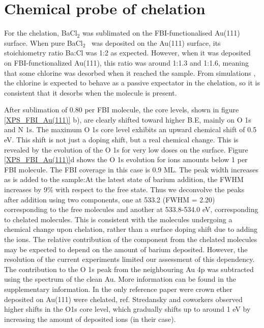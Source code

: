 \documentclass[aps,prl,reprint,longbibliography,superscriptaddress, english]{revtex4-1}
\def\BappCl{BaCl$_2$ }
\begin{document}
\section{Chemical probe of chelation}
For the chelation, \BappCl was sublimated on the FBI-functionalised Au(111) surface. When pure \BappCl\ was deposited on the Au(111) surface, its stoichiometry ratio Ba:Cl was 1:2 as expected. However, when it was deposited on FBI-functionalized Au(111), this ratio was around 1:1.3 and 1:1.6, meaning that some chlorine was desorbed when it reached the sample. From simulations \cite{rivilla_fluorescent_2020}, the chlorine is expected to behave as a passive expectator in the chelation, so it is consistent that it desorbs when the molecule is present.


After sublimation of 0.80 \Bapp per FBI molecule, the core levels, shown in figure \ref{XPS_FBI_Au(111)} b), are clearly shifted toward higher B.E, mainly on O 1s and N 1s. The maximum O 1s core level exhibits an upward chemical shift of 0.5 eV. This shift is not just a doping shift, but a real chemical change. This is revealed by the evolution of the O 1s for very low \Bapp doses on the surface. Figure \ref{XPS_FBI_Au(111)}d shows the O 1s evolution for \Bapp ions amounts below 1 \Bapp per FBI molecule. The FBI coverage in this case is 0.9 ML. The peak width increases as \Bapp is  added to the sample:At the latest state of barium addition, the FWHM increases by 9\% with respect to the free state. Thus we deconvolve the peaks after \Bapp addition using two components, one at 533.2 (FWHM = 2.20) corresponding to the free molecules and another at 533.8-534.0 eV, corresponding to chelated molecules.   This is consistent with the molecules undergoing a chemical change upon chelation, rather than a surface doping shift due to adding the ions. The relative contribution of the component from the chelated molecules may be expected to depend on the amount of barium deposited. However, the resolution of the current experiments limited our assessment of this dependency. The contribution to the O 1s peak from the neighbouring Au 4p was subtracted using the spectrum of the clean Au. More information can be found in the supplementary information.
In the only reference paper were crown ether deposited on Au(111) were chelated, ref. \cite{stredansky_-surface_2019} Stredansky and coworkers observed higher shifts in the O1s core level, which gradually shifts up to around 1 eV by increasing the amount of deposited ions (\Nap in their case). %
\end{document}
